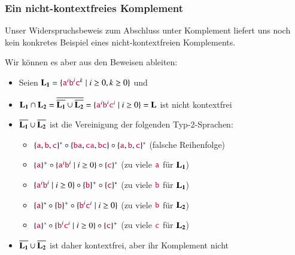 \documentclass[onlymath]{beamer}
\begin{document}
\begin{frame}\frametitle{Ein nicht-kontextfreies Komplement}

Unser Widerspruchsbeweis zum Abschluss unter Komplement liefert uns noch kein 
konkretes Beispiel eines nicht-kontextfreien Komplements.\pause
\medskip

Wir können es aber aus den Beweisen ableiten:
\begin{itemize}
\item Seien $\Slangsub{L}{1}=\{\Sterm{a}^i\Sterm{b}^i\Sterm{c}^k\mid i\geq 0, k\geq 0\}$ 
und 
%
\item $\Slangsub{L}{1}\cap\Slangsub{L}{2}=\overline{\overline{\Slangsub{L}{1}}\cup\overline{\Slangsub{L}{2}}}=\{\Sterm{a}^i\Sterm{b}^i\Sterm{c}^i\mid i\geq 0\}=\Slang{L}$ ist nicht kontextfrei\pause
%
\item $\overline{\Slangsub{L}{1}}\cup\overline{\Slangsub{L}{2}}$ ist die Vereinigung der folgenden Typ-2-Sprachen:
\begin{itemize}
\item $\{\Sterm{a},\Sterm{b},\Sterm{c}\}^*\circ\{\Sterm{ba},\Sterm{ca},\Sterm{bc}\}\circ\{\Sterm{a},\Sterm{b},\Sterm{c}\}^*$ (falsche Reihenfolge)
\item $\{\Sterm{a}\}^+\circ \{\Sterm{a}^i\Sterm{b}^i\mid i\geq 0\}\circ\{\Sterm{c}\}^*$ \hspace{1.25cm}(zu viele $\Sterm{a}$ für $\Slangsub{L}{1}$)
\item $\{\Sterm{a}^i\Sterm{b}^i\mid i\geq 0\}\circ\{\Sterm{b}\}^+\circ\{\Sterm{c}\}^*$ \hspace{1.25cm}(zu viele $\Sterm{b}$ für $\Slangsub{L}{1}$)
\item $\{\Sterm{a}\}^*\circ\{\Sterm{b}\}^+\circ \{\Sterm{b}^i\Sterm{c}^i\mid i\geq 0\}$ \hspace{1.25cm}(zu viele $\Sterm{b}$ für $\Slangsub{L}{2}$)
\item $\{\Sterm{a}\}^*\circ \{\Sterm{b}^i\Sterm{c}^i\mid i\geq 0\}\circ\{\Sterm{c}\}^+$  \hspace{1.25cm}(zu viele $\Sterm{c}$ für $\Slangsub{L}{2}$)
\end{itemize}
%
\item $\overline{\Slangsub{L}{1}}\cup\overline{\Slangsub{L}{2}}$ ist daher kontextfrei, aber ihr Komplement nicht
\end{itemize}


\end{frame}
\end{document}
